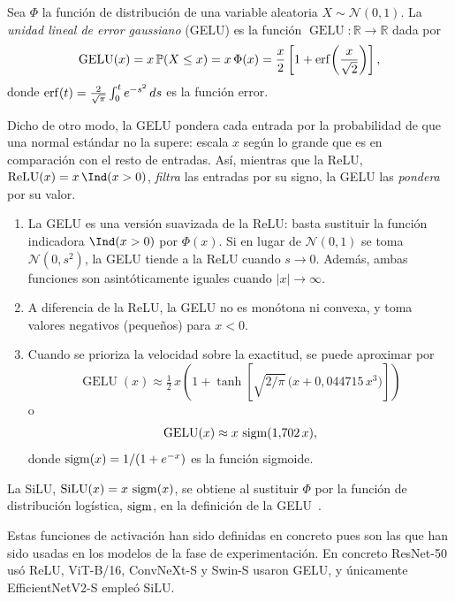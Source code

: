 \begin{definicion}[GELU]\label{def:gelu}
Sea $\Phi$ la función de distribución de una variable aleatoria $X \sim \mathcal{N}(0,1)$. La \emph{unidad lineal de error gaussiano} (GELU) es la función $\operatorname{GELU}\colon \mathbb{R} \to \mathbb{R}$ dada por
\[
  \operatorname{GELU}(x) = x\,\mathbb{P}(X \le x) = x\,\Phi(x)
  = \frac{x}{2}\left[1 + \operatorname{erf}\!\left(\frac{x}{\sqrt{2}}\right)\right],
\]
donde $\operatorname{erf}(t) = \frac{2}{\sqrt{\pi}} \int_0^t e^{-s^2}\,ds$ es la función error.
\end{definicion}

Dicho de otro modo, la GELU pondera cada entrada por la probabilidad de que una normal estándar no la supere: escala $x$ según lo grande que es en comparación con el resto de entradas. Así, mientras que la ReLU, $\operatorname{ReLU}(x) = x\,\Ind(x>0)$, \emph{filtra} las entradas por su signo, la GELU las \emph{pondera} por su valor.

\begin{observacion}
\begin{enumerate}
  \item La GELU es una versión suavizada de la ReLU: basta sustituir la función indicadora $\Ind(x>0)$ por $\Phi(x)$. Si en lugar de $\mathcal{N}(0,1)$ se toma $\mathcal{N}(0,s^2)$, la GELU tiende a la ReLU cuando $s \to 0$. Además, ambas funciones son asintóticamente iguales cuando $|x| \to \infty$.
  \item A diferencia de la ReLU, la GELU no es monótona ni convexa, y toma valores negativos (pequeños) para $x<0$.
  \item Cuando se prioriza la velocidad sobre la exactitud, se puede aproximar por
  \[
    \operatorname{GELU}(x) \approx \tfrac{1}{2}\,x\left(1 + \tanh\!\left[\sqrt{2/\pi}\,\bigl(x + 0{,}044715\,x^3\bigr)\right]\right)
  \]
  o
  \[
    \operatorname{GELU}(x) \approx x\,\operatorname{sigm}(1{,}702\,x),
  \]
  donde $\operatorname{sigm}(x) = 1/(1+e^{-x})$ es la función sigmoide.
\end{enumerate}
\end{observacion}

\begin{definicion}[SiLU]\label{def:silu}
  La SiLU, $\operatorname{SiLU}(x) = x\,\operatorname{sigm}(x)$, se obtiene al sustituir $\Phi$ por la función de distribución logística, $\operatorname{sigm}$, en la definición de la GELU~\cite{hendrycks2016gelu}.
\end{definicion}

Estas funciones de activación han sido definidas en concreto pues son las que han sido usadas en los modelos de la fase de experimentación. En concreto ResNet-50 usó ReLU,
ViT-B/16, ConvNeXt-S y Swin-S usaron GELU, y únicamente EfficientNetV2-S empleó SiLU.

